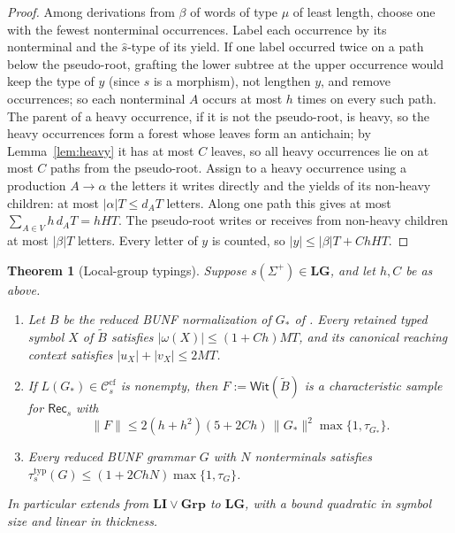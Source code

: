 \documentclass[11pt]{article}
\numberwithin{equation}{section}
\theoremstyle{plain}
\newtheorem{theorem}{Theorem}[section]
\theoremstyle{definition}
\theoremstyle{remark}
\theoremstyle{plain}
\newcommand{\cf}{\mathrm{cf}}
\newcommand{\Ccf}[1]{\mathcal C_{#1}^{\cf}}
\newcommand{\Rec}{\mathsf{Rec}}
\newcommand{\WitnessSet}{\mathsf{Wit}}
\newcommand{\LG}{\mathbf{LG}}
\begin{document}
\begin{proof}
Among derivations from $\beta$ of words of type $\mu$ of least length, choose one
with the fewest nonterminal occurrences.  Label each occurrence by its
nonterminal and the $\widehat s$-type of its yield.  If one label occurred twice on
a path below the pseudo-root, grafting the lower subtree at the upper occurrence
would keep the type of $y$ (since $\widehat s$ is a morphism), not lengthen $y$, and
remove occurrences; so each nonterminal $A$ occurs at most $h$ times on every
such path.  The parent of a heavy occurrence, if it is not the pseudo-root, is
heavy, so the heavy occurrences form a forest whose leaves form an antichain;
by Lemma~\ref{lem:heavy} it has at most $C$ leaves, so all heavy occurrences lie
on at most $C$ paths from the pseudo-root.  Assign to a heavy occurrence using a
production $A\to\alpha$ the letters it writes directly and the yields of its
non-heavy children: at most $|\alpha|T\le d_AT$ letters.  Along one path this
gives at most $\sum_{A\in V}h\,d_AT=hHT$.
The pseudo-root writes or receives from non-heavy children at most $|\beta|T$
letters.  Every letter of $y$ is counted, so $|y|\le|\beta|T+ChHT$.
\end{proof}

\begin{theorem}[Local-group typings]
\label{thm:lg-sufficiency}
Suppose $s(\Sigma^+)\in\LG$, and let $h,C$ be as above.
\begin{enumerate}[label=\textup{(\roman*)},leftmargin=*]
\item Let $B$ be the reduced BUNF normalization of $G_*$ of
\cite[Proposition~7.3 and Appendix~A.2]{kuriyamaCFG}.  Every retained typed
symbol $X$ of $\widetilde B$ satisfies $|\omega(X)|\le(1+Ch)MT$, and its canonical
reaching context satisfies $|u_X|+|v_X|\le2MT$.
\item If $L(G_*)\in\Ccf{s}$ is nonempty, then $F:=\WitnessSet(\widetilde B)$ is a
characteristic sample for $\Rec_s$ with
\[
 \|F\|\le2(h+h^2)(5+2Ch)\,\|G_*\|^2\max\{1,\tau_{G_*}\}.
\]
\item Every reduced BUNF grammar $G$ with $N$ nonterminals satisfies
$\tau^{\mathrm{typ}}_s(G)\le(1+2ChN)\max\{1,\tau_G\}$.
\end{enumerate}
In particular \cite[Corollary~7.5]{kuriyamaCFG} extends from
$\mathbf{LI}\vee\mathbf{Grp}$ to $\LG$, with a bound quadratic in symbol size and
linear in thickness.
\end{theorem}
\end{document}
